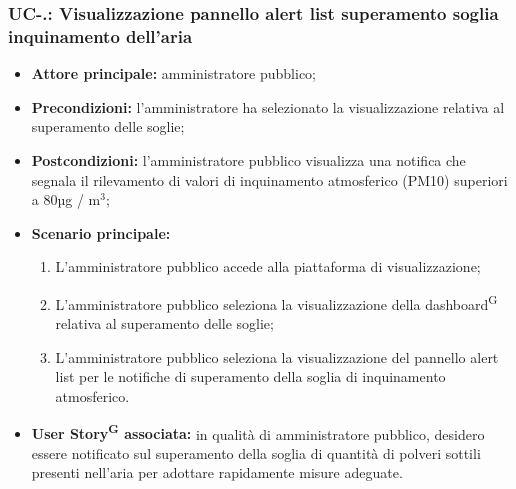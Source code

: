 \documentclass[8pt]{article}
\newcommand{\glossterm}[1]{#1\textsuperscript{G}} %
\begin{document}
\subsubsection*{UC-\theuc .\speconenumber: Visualizzazione pannello alert list superamento soglia inquinamento dell'aria}
\begin{itemize}
    \item \textbf{Attore principale:} amministratore pubblico;
    \item \textbf{Precondizioni:} l'amministratore ha selezionato la visualizzazione relativa al superamento delle soglie;
    \item \textbf{Postcondizioni:} l’amministratore pubblico visualizza una notifica che segnala il rilevamento di valori di inquinamento atmosferico (PM10) superiori a 80µg / $\mbox{m}^{\mbox{3}}$;
    \item \textbf{Scenario principale:}
        \begin{enumerate}
        \item L’amministratore pubblico accede alla piattaforma di visualizzazione;
        \item L’amministratore pubblico seleziona la visualizzazione della \glossterm{dashboard} relativa al superamento delle soglie;
        \item L'amministratore pubblico seleziona la visualizzazione del pannello alert list per le notifiche di superamento della soglia di inquinamento atmosferico.
        \end{enumerate}
    \item \textbf{\glossterm{User Story} associata:} in qualità di amministratore pubblico, desidero essere notificato sul superamento della soglia di quantità di polveri sottili presenti nell'aria per adottare rapidamente misure adeguate.
\end{itemize}
\end{document}
